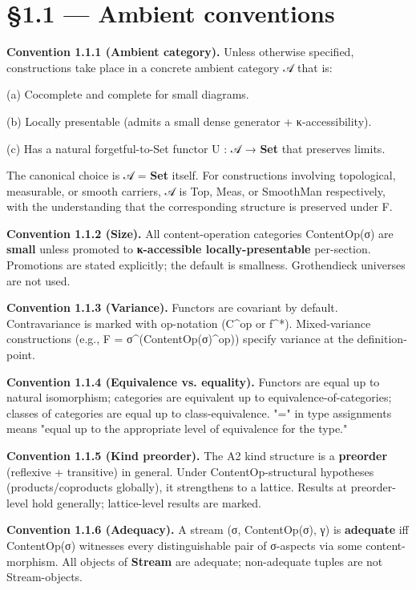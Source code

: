 \documentclass[11pt, openany]{book}
\newcommand{\sectionbreak}{\clearpage}
\begin{document}
\sectionbreak

\section{§1.1 --- Ambient conventions}

\textbf{Convention 1.1.1 (Ambient category).} Unless otherwise specified, constructions take place in a concrete ambient category 𝒜 that is:

(a) Cocomplete and complete for small diagrams.

(b) Locally presentable (admits a small dense generator + κ-accessibility).

(c) Has a natural forgetful-to-Set functor U : 𝒜 → \textbf{Set} that preserves limits.

The canonical choice is 𝒜 = \textbf{Set} itself. For constructions involving topological, measurable, or smooth carriers, 𝒜 is Top, Meas, or SmoothMan respectively, with the understanding that the corresponding structure is preserved under F.

\textbf{Convention 1.1.2 (Size).} All content-operation categories ContentOp(σ) are \textbf{small} unless promoted to \textbf{κ-accessible locally-presentable} per-section. Promotions are stated explicitly; the default is smallness. Grothendieck universes are not used.

\textbf{Convention 1.1.3 (Variance).} Functors are covariant by default. Contravariance is marked with op-notation (C\textasciicircum{}op or f\textasciicircum{}*). Mixed-variance constructions (e.g., F = σ\textasciicircum{}(ContentOp(σ)\textasciicircum{}op)) specify variance at the definition-point.

\textbf{Convention 1.1.4 (Equivalence vs. equality).} Functors are equal up to natural isomorphism; categories are equivalent up to equivalence-of-categories; classes of categories are equal up to class-equivalence. "=" in type assignments means "equal up to the appropriate level of equivalence for the type."

\textbf{Convention 1.1.5 (Kind preorder).} The A2 kind structure is a \textbf{preorder} (reflexive + transitive) in general. Under ContentOp-structural hypotheses (products/coproducts globally), it strengthens to a lattice. Results at preorder-level hold generally; lattice-level results are marked.

\textbf{Convention 1.1.6 (Adequacy).} A stream (σ, ContentOp(σ), γ) is \textbf{adequate} iff ContentOp(σ) witnesses every distinguishable pair of σ-aspects via some content-morphism. All objects of \textbf{Stream} are adequate; non-adequate tuples are not Stream-objects.
\end{document}
